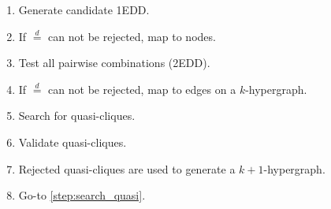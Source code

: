 \documentclass[10pt]{beamer}
\newcommand{\eqdist}{\stackrel{d}{=}}
\begin{document}

\begin{frame}{}
    \begin{columns}
    \begin{column}{0.5\linewidth}
        \renewcommand{\theenumi}{\alph{enumi}}
        \begin{enumerate}
            \item Generate candidate 1EDD.
            \item If $\eqdist$ can not be rejected, map to nodes.
            \item Test all pairwise combinations (2EDD).
            \item If $\eqdist$ can not be rejected, map to edges on a $k$-hypergraph.
            \item Search for quasi-cliques\label{step:search_quasi}.
            \item Validate quasi-cliques.
            \item Rejected quasi-cliques are used to generate a $k+1$-hypergraph.
            \item Go-to \ref{step:search_quasi}.
        \end{enumerate}
    \end{column}
    \begin{column}{.5\linewidth}

\end{column}
\end{columns}
\end{frame}
\end{document}
